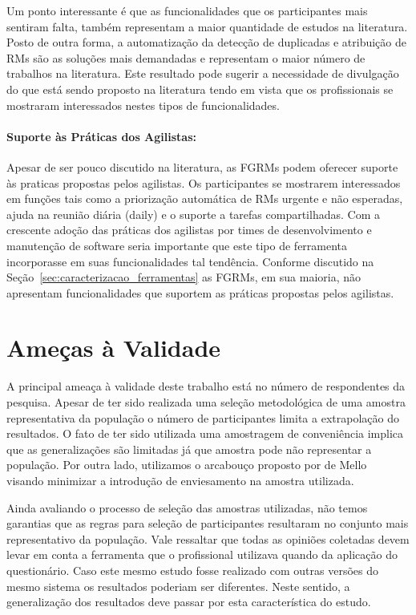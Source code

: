 Um ponto interessante é que as funcionalidades que os participantes mais
sentiram falta, também representam a maior quantidade de estudos na literatura.
Posto de outra forma, a automatização da detecção de duplicadas e atribuição de
RMs são as soluções mais demandadas e representam o maior número de trabalhos na
literatura. Este resultado pode sugerir a necessidade de divulgação do que está
sendo proposto na literatura tendo em vista que os profissionais se mostraram
interessados nestes tipos de funcionalidades.

\paragraph{Suporte às Práticas dos Agilistas:}
\label{par:pesq_profissionais_suporte_pratica_agilistas}

Apesar de ser pouco discutido na literatura, as FGRMs podem oferecer suporte às
praticas propostas pelos agilistas. Os participantes se mostrarem interessados
em funções tais como a priorização automática de RMs urgente e não esperadas,
ajuda na reunião diária (daily) e o suporte a tarefas compartilhadas. Com a
crescente adoção das práticas dos agilistas por times de desenvolvimento e
manutenção de software seria importante que este tipo de ferramenta incorporasse
em suas funcionalidades tal tendência. Conforme discutido na
Seção~\ref{sec:caracterizacao_ferramentas} as FGRMs, em sua maioria, não
apresentam funcionalidades que suportem as práticas propostas pelos agilistas.

\section{Ameças à Validade}
\label{sec:pesquisa_profissionais_ameacas_validade}

A principal ameaça à validade deste trabalho está no número de respondentes da
pesquisa. Apesar de ter sido realizada uma seleção metodológica de uma amostra
representativa da população o número de participantes limita a extrapolação do
resultados. O fato de ter sido utilizada uma amostragem de conveniência implica
que as generalizações são limitadas já que amostra pode não representar a
população. Por outra lado, utilizamos o arcabouço proposto por de
Mello~\cite{de2014towards} visando minimizar a introdução de enviesamento na
amostra utilizada.

Ainda avaliando o processo de seleção das amostras utilizadas, não temos
garantias que as regras para seleção de participantes resultaram no conjunto
mais representativo da população. Vale ressaltar que todas as opiniões coletadas
devem levar em conta a ferramenta que o profissional utilizava quando da
aplicação do questionário. Caso este mesmo estudo fosse realizado com outras
versões do mesmo sistema os resultados poderiam ser diferentes. Neste sentido, a
generalização dos resultados deve passar por esta característica do estudo.

